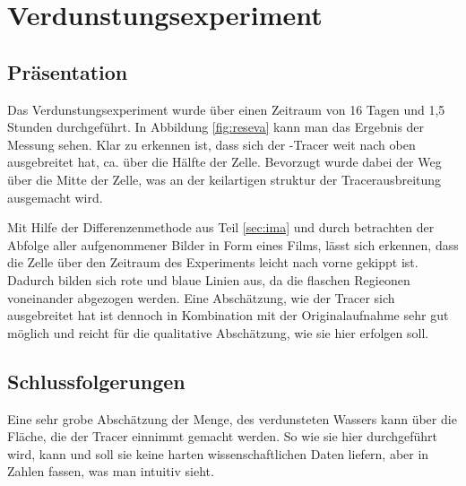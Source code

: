 
\label{cha:res}
\section{Verdunstungsexperiment}
\label{res:eva}

\subsection{Präsentation}
\label{res:eva:pres}



Das Verdunstungsexperiment wurde über einen Zeitraum von 16 Tagen und 1,5 Stunden durchgeführt. In Abbildung \ref{fig:reseva} kann man das Ergebnis der Messung sehen. Klar zu erkennen ist, dass sich der \BB-Tracer weit nach oben ausgebreitet hat, ca. über die Hälfte der Zelle. Bevorzugt wurde dabei der Weg über die Mitte der Zelle, was an der keilartigen struktur der Tracerausbreitung ausgemacht wird. 

Mit Hilfe der Differenzenmethode aus Teil \ref{sec:ima} und durch betrachten der Abfolge aller aufgenommener Bilder in Form eines Films, lässt sich erkennen, dass die Zelle über den Zeitraum des Experiments leicht nach vorne gekippt ist. Dadurch bilden sich rote und blaue Linien aus, da die flaschen Regieonen voneinander abgezogen werden. Eine Abschätzung, wie der Tracer sich ausgebreitet hat ist dennoch in Kombination mit der Originalaufnahme sehr gut möglich und reicht für die qualitative Abschätzung, wie sie hier erfolgen soll.


\subsection{Schlussfolgerungen}
\label{res:eva:disk}

Eine sehr grobe Abschätzung der Menge, des verdunsteten Wassers kann über die Fläche, die der Tracer einnimmt gemacht werden. So wie sie hier durchgeführt wird, kann und soll sie keine harten wissenschaftlichen Daten liefern, aber in Zahlen fassen, was man intuitiv sieht.

